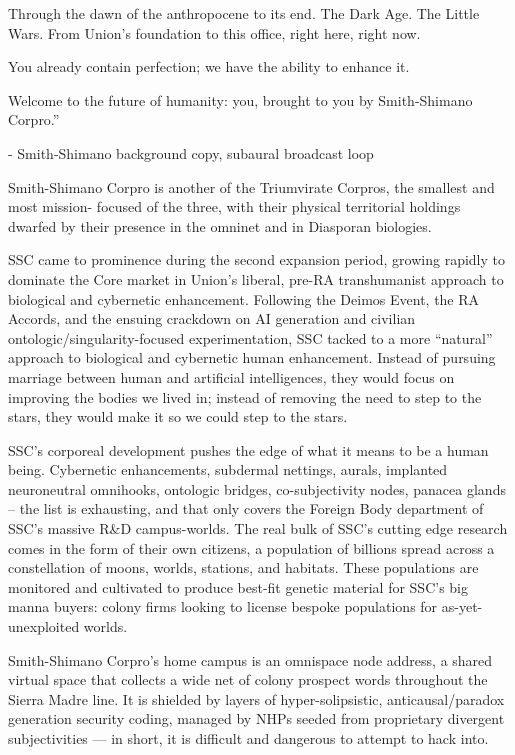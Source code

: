          Through the dawn of the anthropocene to its end. The Dark Age. The Little Wars.
         From Union’s foundation to this office, right here, right now.

         You already contain perfection; we have the ability to enhance it.

         Welcome to the future of humanity: you, brought to you by Smith-Shimano Corpro.”

             -   Smith-Shimano background copy, subaural broadcast loop




Smith-Shimano Corpro is another of the Triumvirate Corpros, the smallest and most mission-
focused of the three, with their physical territorial holdings dwarfed by their presence in the
omninet and in Diasporan biologies.


SSC came to prominence during the second expansion period, growing rapidly to dominate the
Core market in Union’s liberal, pre-RA transhumanist approach to biological and cybernetic
enhancement. Following the Deimos Event, the RA Accords, and the ensuing crackdown on AI
generation and civilian ontologic/singularity-focused experimentation, SSC tacked to a more
“natural” approach to biological and cybernetic human enhancement. Instead of pursuing
marriage between human and artificial intelligences, they would focus on improving the bodies
we lived in; instead of removing the need to step to the stars, they would make it so we could
step to the stars.


SSC’s corporeal development pushes the edge of what it means to be a human being.
Cybernetic enhancements, subdermal nettings, aurals, implanted neuroneutral omnihooks,
ontologic bridges, co-subjectivity nodes, panacea glands -- the list is exhausting, and that only
covers the Foreign Body department of SSC’s massive R\&D campus-worlds. The real bulk of
SSC’s cutting edge research comes in the form of their own citizens, a population of billions
spread across a constellation of moons, worlds, stations, and habitats. These populations are
monitored and cultivated to produce best-fit genetic material for SSC’s big manna buyers:
colony firms looking to license bespoke populations for as-yet-unexploited worlds.


Smith-Shimano Corpro’s home campus is an omnispace node address, a shared virtual space
that collects a wide net of colony prospect words throughout the Sierra Madre line. It is shielded
by layers of hyper-solipsistic, anticausal/paradox generation security coding, managed by NHPs
seeded from proprietary divergent subjectivities — in short, it is difficult and dangerous to
attempt to hack into.


